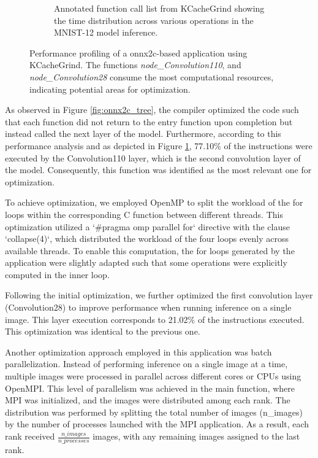\documentclass[fleqn,10pt]{olplainarticle}
\begin{document}
\begin{figure}[!ht]
\begin{subfigure}[b]{0.45\textwidth}
        \caption{Annotated function call list from KCacheGrind showing the time distribution across various operations in the MNIST-12 model inference.}
        \label{fig:onnx2c_ir}
    \end{subfigure}
    \caption{Performance profiling of a onnx2c-based application using KCacheGrind. The functions \textit{node\_Convolution110}, and \textit{node\_Convolution28} consume the most computational resources, indicating potential areas for optimization.}
    \label{fig:onnx2c}
\end{figure}

As observed in Figure \ref{fig:onnx2c_tree}, the compiler optimized the code such that each function did not return to the entry function upon completion but instead called the next layer of the model. Furthermore, according to this performance analysis and as depicted in Figure \ref{fig:onnx2c_ir}, 77.10\% of the instructions were executed by the Convolution110 layer, which is the second convolution layer of the model. Consequently, this function was identified as the most relevant one for optimization.

To achieve optimization, we employed OpenMP to split the workload of the for loops within the corresponding C function between different threads. This optimization utilized a `\#pragma omp parallel for` directive with the clause `collapse(4)`, which distributed the workload of the four loops evenly across available threads. To enable this computation, the for loops generated by the application were slightly adapted such that some operations were explicitly computed in the inner loop.

Following the initial optimization, we further optimized the first convolution layer (Convolution28) to improve performance when running inference on a single image. This layer execution corresponds to 21.02\% of the instructions executed. This optimization was identical to the previous one.

Another optimization approach employed in this application was batch parallelization. Instead of performing inference on a single image at a time, multiple images were processed in parallel across different cores or CPUs using OpenMPI. This level of parallelism was achieved in the main function, where MPI was initialized, and the images were distributed among each rank. The distribution was performed by splitting the total number of images (n\_images) by the number of processes launched with the MPI application. As a result, each rank received $\frac{n\_images}{n\_processes}$ images, with any remaining images assigned to the last rank.
\end{document}
